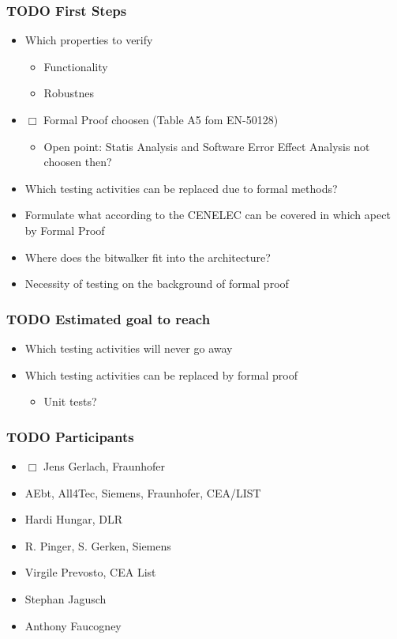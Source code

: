 \documentclass[a4paper,german]{article}
\begin{document}
\subsubsection{\textbf{TODO} First Steps}
\label{sec-1-6-1}

\begin{itemize}
\item Which properties to verify
\begin{itemize}
\item Functionality
\item Robustnes
\end{itemize}
\item $\Box$ Formal Proof choosen (Table A5 fom EN-50128)
\begin{itemize}
\item Open point: Statis Analysis and Software Error Effect Analysis not choosen then?
\end{itemize}
\item Which testing activities can be replaced due to formal methods?
\item Formulate what according to the CENELEC can be covered in which apect by Formal Proof
\item Where does the bitwalker fit into the architecture?
\item Necessity of testing on the background of formal proof
\end{itemize}
\subsubsection{\textbf{TODO} Estimated goal to reach}
\label{sec-1-6-2}

\begin{itemize}
\item Which testing activities will never go away
\item Which testing activities can be replaced by formal proof
\begin{itemize}
\item Unit tests?
\end{itemize}
\end{itemize}
\subsubsection{\textbf{TODO} Participants}
\label{sec-1-6-3}

\begin{itemize}
\item $\Box$ Jens Gerlach, Fraunhofer
\item AEbt, All4Tec, Siemens, Fraunhofer, CEA/LIST
\item Hardi Hungar, DLR
\item R. Pinger, S. Gerken, Siemens
\item Virgile Prevosto, CEA List
\item Stephan Jagusch
\item Anthony Faucogney
\end{itemize}
\end{document}
